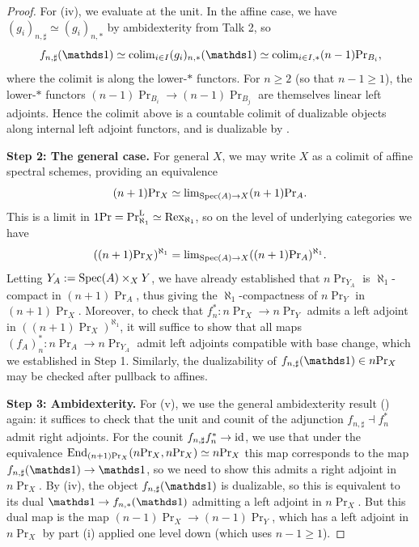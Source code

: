 \documentclass[11pt]{book}
\begin{document}
\begin{proof}
		For (iv), we evaluate at the unit. In the affine case, we have $(g_i)_{n,\sharp} \simeq (g_i)_{n,*}$ by ambidexterity from Talk 2, so
		\[
			f_{n,\sharp}(\unit) \simeq \colim_{i \in I} (g_i)_{n,*}(\unit) \simeq \colim_{i \in I,*} (n-1)\Pr_{B_i},
		\]
		where the colimit is along the lower-$\ast$ functors. For $n \geq 2$ (so that $n - 1 \geq 1$), the lower-$\ast$ functors $(n-1)\Pr_{B_i} \to (n-1)\Pr_{B_j}$ are themselves linear left adjoints. Hence the colimit above is a countable colimit of dualizable objects along internal left adjoint functors, and is dualizable by .

		\textbf{Step 2: The general case.} For general $X$, we may write $X$ as a colimit of affine spectral schemes, providing an equivalence
		\[
			(n+1)\textup{Pr}_X \simeq \operatorname{lim}_{\operatorname{Spec}(A) \to X} (n+1)\textup{Pr}_A.
		\]
		This is a limit in $1\textup{Pr} = \textup{Pr}^{\textup{L}}_{\aleph_1} \simeq \operatorname{Rex}_{\aleph_1}$, so on the level of underlying categories we have
		\[
			((n+1)\textup{Pr}_{X})^{\aleph_1} = \operatorname{lim}_{\operatorname{Spec}(A) \to X} ((n+1)\textup{Pr}_{A})^{\aleph_1}.
		\]
		Letting $Y_A := \operatorname{Spec}(A) \times_X Y$, we have already established that $n\Pr_{Y_A}$ is $\aleph_1$-compact in $(n+1)\Pr_A$, thus giving the $\aleph_1$-compactness of $n\Pr_Y$ in $(n+1)\Pr_X$. Moreover, to check that $f_n^*\colon n\Pr_X \to n\Pr_Y$ admits a left adjoint in $((n+1)\Pr_{X})^{\aleph_1}$, it will suffice to show that all maps $(f_A)_n^*\colon n\Pr_A \to n\Pr_{Y_A}$ admit left adjoints compatible with base change, which we established in Step 1. Similarly, the dualizability of $f_{n,\sharp}(\unit) \in n\Pr_X$ may be checked after pullback to affines.

		\textbf{Step 3: Ambidexterity.} For (v), we use the general ambidexterity result () again: it suffices to check that the unit and counit of the adjunction $f_{n,\sharp} \dashv f_n^*$ admit right adjoints. For the counit $f_{n,\sharp} f_n^* \to \operatorname{id}$, we use that under the equivalence $\operatorname{End}_{(n+1)\textup{Pr}_X}(n\textup{Pr}_X,n\textup{Pr}_X) \simeq n\textup{Pr}_X$ this map corresponds to the map $f_{n,\sharp}(\unit) \to \unit$, so we need to show this admits a right adjoint in $n\Pr_X$. By (iv), the object $f_{n,\sharp}(\unit)$ is dualizable, so this is equivalent to its dual $\unit \to f_{n,\ast}(\unit)$ admitting a left adjoint in $n\Pr_X$. But this dual map is the map $(n-1)\Pr_X \to (n-1)\Pr_Y$, which has a left adjoint in $n\Pr_X$ by part (i) applied one level down (which uses $n - 1 \geq 1$).


\end{proof}
\end{document}
